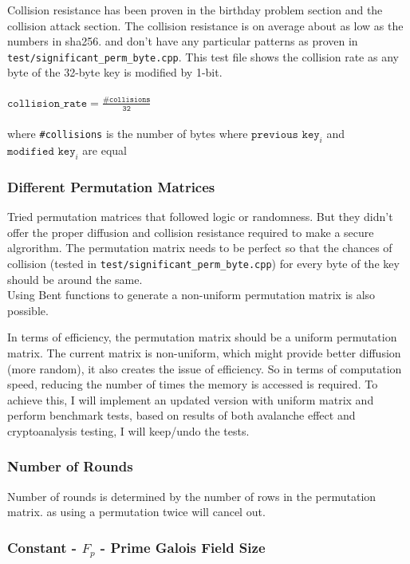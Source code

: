 \documentclass[fleqn, a4paper,12pt]{article}
\begin{document}
Collision resistance has been proven in the birthday problem section and the collision attack section. The collision resistance is on average about as low as the numbers in sha256. and don't have any particular patterns as proven in \texttt{test/significant\_perm\_byte.cpp}. This test file shows the collision rate as any byte of the 32-byte key is modified by 1-bit.
\\\\
$\texttt{collision\_rate} = \frac{\texttt{\#collisions}}{\texttt{32}}$\\
 \\ where \texttt{\#collisions} is the number of bytes where $\texttt{previous key}_i$ and $\texttt{modified key}_i$ are equal

\subsubsection{Different Permutation Matrices}

Tried permutation matrices that followed logic or randomness. But they didn't offer the proper diffusion and collision resistance required to make a secure algrorithm. The permutation matrix needs to be perfect so that the chances of collision (tested in \texttt{test/significant\_perm\_byte.cpp}) for every byte of the key should be around the same.\\
Using Bent functions to generate a non-uniform permutation matrix is also possible.

In terms of efficiency, the permutation matrix should be a uniform permutation matrix. The current matrix is non-uniform, which might provide better diffusion (more random), it also creates the issue of efficiency. So in terms of computation speed, reducing the number of times the memory is accessed is required. To achieve this, I will implement an updated version with uniform matrix and perform benchmark tests, based on results of both avalanche effect and cryptoanalysis testing, I will keep/undo the tests.

\subsubsection{Number of Rounds}

Number of rounds is determined by the number of rows in the permutation matrix. as using a permutation twice will cancel out.

\subsubsection{Constant - $F_p$ - Prime Galois Field Size}
\end{document}
